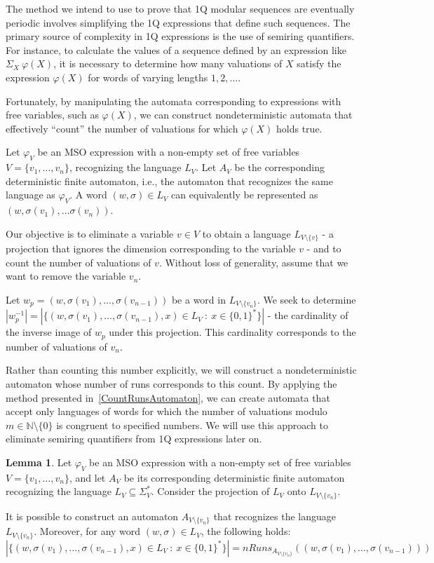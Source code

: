 \documentclass[en]{pracamgr}
\theoremstyle{definition}
\newtheorem{lemma}[theorem]{Lemma}
\begin{document}
The method we intend to use to prove that 1Q modular sequences are eventually periodic involves simplifying the 1Q expressions that define such sequences. The primary source of complexity in 1Q expressions is the use of semiring quantifiers. For instance, to calculate the values of a sequence defined by an expression like $\Sigma_X \ \varphi(X)$, it is necessary to determine how many valuations of $X$ satisfy the expression $\varphi(X)$ for words of varying lengths $1,2,\ldots$.

Fortunately, by manipulating the automata corresponding to expressions with free variables, such as $\varphi(X)$, we can construct nondeterministic automata that effectively ``count'' the number of valuations for which $\varphi(X)$ holds true.

Let $\varphi_V$ be an MSO expression with a non-empty set of free variables $V = \{v_1, \ldots, v_n\}$, recognizing the language $L_V$. Let $A_V$ be the corresponding deterministic finite automaton, i.e., the automaton that recognizes the same language as $\varphi_V$. A word $(w, \sigma) \in L_V$ can equivalently be represented as $(w, \sigma(v_1), \ldots \sigma(v_n))$.

Our objective is to eliminate a variable $v \in V$ to obtain a language $L_{V \setminus \{v\}}$ - a projection that ignores the dimension corresponding to the variable $v$ - and to count the number of valuations of $v$. Without loss of generality, assume that we want to remove the variable $v_n$.

Let $w_p = (w, \sigma(v_1), \ldots, \sigma(v_{n-1}))$ be a word in $L_{V \setminus \{v_n\}}$. We seek to determine $|w_p^{-1}| = |\{ (w, \sigma(v_1), \ldots, \sigma(v_{n-1}), x) \in L_V \ : \ x \in \{0,1\}^* \}|$ - the cardinality of the inverse image of $w_p$ under this projection. This cardinality corresponds to the number of valuations of $v_n$.

Rather than counting this number explicitly, we will construct a nondeterministic automaton whose number of runs corresponds to this count. By applying the method presented in~\cref{CountRunsAutomaton}, we can create automata that accept only languages of words for which the number of valuations modulo $m \in \mathbb{N} \setminus \{0\}$ is congruent to specified numbers. We will use this approach to eliminate semiring quantifiers from 1Q expressions later on.

\begin{lemma}
\label{LemElimVar}
    Let $\varphi_V$ be an MSO expression with a non-empty set of free variables $V = \{v_1, \ldots, v_n\}$, and let $A_V$ be its corresponding deterministic finite automaton recognizing the language $L_V \subseteq \Sigma_V^*$. Consider the projection of $L_V$ onto $L_{V \setminus \{v_n\}}$. 
    
    It is possible to construct an automaton $A_{V \setminus \{v_n\}}$ that recognizes the language $L_{V \setminus \{v_n\}}$. Moreover, for any word $(w, \sigma) \in L_V$, the following holds:
    $$|\{ (w, \sigma(v_1), \ldots, \sigma(v_{n-1}), x) \in L_V \ : \ x \in \{0,1\}^* \}| = nRuns_{A_{V \setminus \{v_n\}}}((w, \sigma(v_1), \ldots, \sigma(v_{n-1})))$$
\end{lemma}
\end{document}
